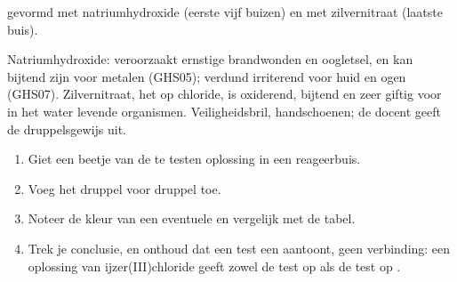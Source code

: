 \begin{omfigure}

{\small {} gevormd met natriumhydroxide (eerste vijf buizen) en
met zilvernitraat (laatste buis).}
\end{omfigure}

\begin{safety}{}
Natriumhydroxide: veroorzaakt ernstige brandwonden en oogletsel, en kan
bijtend zijn voor metalen (GHS05); verdund irriterend voor huid en ogen
(GHS07). Zilvernitraat, het  op chloride, is oxiderend, bijtend
en zeer giftig voor in het water levende organismen. Veiligheidsbril,
handschoenen; de docent geeft de  druppelsgewijs uit.
\end{safety}

\begin{method}\label{met:g9:ions:test}
\begin{enumerate}
  \item Giet een beetje van de te testen oplossing in een reageerbuis.
  \item Voeg het  druppel voor druppel toe.
  \item Noteer de kleur van een eventuele  en vergelijk met de
        tabel.
  \item Trek je conclusie, en onthoud dat een test een  aantoont,
        geen verbinding: een oplossing van ijzer(III)chloride geeft
        zowel de test op  als de test op .
\end{enumerate}
\end{method}

